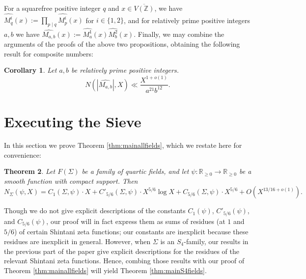 \documentclass{article}
\def\Z{{\mathbb Z}}
\def\R{{\mathbb R}}
\def\Z{{\mathbb Z}}
\def\ol{\overline}
\newtheorem{theorem}{Theorem}[section]
\newtheorem{corollary}[theorem]{Corollary}
\begin{document}
For a squarefree positive integer $q$ and $x\in\ol{V(\Z)}$, we have $\widehat{M^i_q}(x):=\prod_{p\mid q}\widehat{M^i_p}(x)$ for $i\in\{1,2\}$, and for relatively prime positive integers $a,b$ we have $\widehat{M_{a,b}}(x):=\widehat{M^1_a}(x)\widehat{M^2_b}(x)$. 
Finally, we may combine the arguments of the proofs of the above two propositions, obtaining the following result for composite numbers:


\begin{corollary}\label{cor:boundsftcomposite}
Let $a,b$ be relatively prime positive integers. 
$$N(|\widehat{M_{a,b}}|,X)\ll \frac{X^{1+o(1)}}{a^{21}b^{12}}.$$

\end{corollary}




\section{Executing the Sieve}
In this section we prove Theorem \ref{thm:mainallfields}, which we restate here for convenience:


\begin{theorem}
Let $F(\Sigma)$ be a family of quartic fields, and let $\psi:\R_{\geq 0}\to\R_{\geq 0}$ be a smooth function with compact support. Then 
\begin{equation*}
N_{\Sigma}(\psi,X)=C_1(\Sigma,\psi)\cdot X+
C'_{5/6}(\Sigma,\psi)\cdot X^{5/6}\log X + C_{5/6}(\Sigma,\psi)\cdot X^{5/6} + O(X^{13/16+o(1)}).
\end{equation*}
\end{theorem}
Though we do not give explicit descriptions of the constants $C_1(\psi)$, $C'_{5/6}(\psi)$, and $C_{5/6}(\psi)$, our proof will in fact express them as sums of residues (at $1$ and $5/6$) of certain Shintani zeta functions; our constants are inexplicit because these residues are inexplicit in general. However, when $\Sigma$ is an $S_4$-family, our results in the previous part of the paper give explicit descriptions for the residues of the relevant Shintani zeta functions. Hence, combing those results with our proof of Theorem \ref{thm:mainallfields} will yield Theorem \ref{thm:mainS4fields}.
\end{document}
